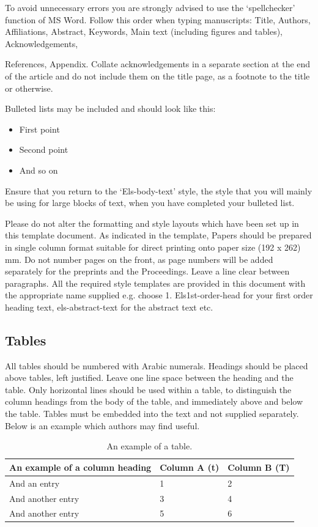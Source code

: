\documentclass[3p,times,procedia]{elsarticle}
\begin{document}
To avoid unnecessary errors you are strongly advised to use the `spellchecker' function of MS Word. Follow this order when typing manuscripts: Title, Authors, Affiliations, Abstract, Keywords, Main text (including figures and tables), Acknowledgements,

References, Appendix. Collate acknowledgements in a separate section at the end of the article and do not include them on the title page, as a footnote to the title or otherwise.

Bulleted lists may be included and should look like this:
\begin{itemize}[]
\item First point
\item Second point
\item And so on
\end{itemize}

Ensure that you return to the `Els-body-text' style, the style that you will mainly be using for large blocks of text, when you have completed your bulleted list.

Please do not alter the formatting and style layouts which have been set up in this template document. As indicated in the template, 
Papers should be prepared in single column format suitable for direct printing onto paper size (192 x 262) mm. Do not number pages on the front, as page numbers will be added separately for the preprints and the Proceedings. Leave a line clear between paragraphs. 
All the required style templates are provided in this document with the appropriate name supplied e.g. choose 1. Els1st-order-head for your first order heading text, els-abstract-text for the abstract text etc.

\subsection{ Tables}

All tables should be numbered with Arabic numerals. Headings should be placed above tables, left justified. Leave one line space between the heading and the table. Only horizontal lines should be used within a table, to distinguish the column headings from the body of the table, and immediately above and below the table. Tables must be embedded into the text and not supplied separately. Below is an example which authors may find useful.

\begin{table}[h]
\caption{An example of a table.}
\begin{tabular*}{\hsize}{@{\extracolsep{\fill}}lll@{}}
\hline
An example of a column heading & Column A (t) & Column B (T)\\
\hline
And an entry &   1 &  2\\
And another entry  & 3 &  4\\
And another entry &  5 &  6\\
\hline
\end{tabular*}
\end{table}
\end{document}
